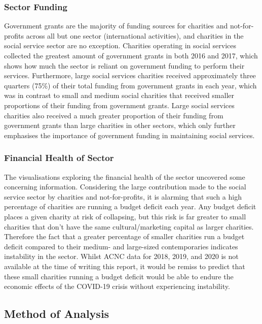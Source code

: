\documentclass[
  11pt,
]{article}
\begin{document}
\hypertarget{sector-funding-1}{%
\subsubsection{Sector Funding}\label{sector-funding-1}}

Government grants are the majority of funding sources for charities and not-for-profits across all but one sector (international activities), and charities in the social service sector are no exception. Charities operating in social services collected the greatest amount of government grants in both 2016 and 2017, which shows how much the sector is reliant on government funding to perform their services. Furthermore, large social services charities received approximately three quarters (75\%) of their total funding from government grants in each year, which was in contrast to small and medium social charities that received smaller proportions of their funding from government grants. Large social services charities also received a much greater proportion of their funding from government grants than large charities in other sectors, which only further emphasises the importance of government funding in maintaining social services.

\hypertarget{financial-health-of-sector-1}{%
\subsubsection{Financial Health of Sector}\label{financial-health-of-sector-1}}

The visualisations exploring the financial health of the sector uncovered some concerning information. Considering the large contribution made to the social service sector by charities and not-for-profits, it is alarming that such a high percentage of charities are running a budget deficit each year. Any budget deficit places a given charity at risk of collapsing, but this risk is far greater to small charities that don't have the same cultural/marketing capital as larger charities. Therefore the fact that a greater percentage of smaller charities run a budget deficit compared to their medium- and large-sized contemporaries indicates instability in the sector. Whilst ACNC data for 2018, 2019, and 2020 is not available at the time of writing this report, it would be remiss to predict that these small charities running a budget deficit would be able to endure the economic effects of the COVID-19 crisis without experiencing instability.

\hypertarget{method-of-analysis}{%
\subsection{Method of Analysis}\label{method-of-analysis}}
\end{document}
